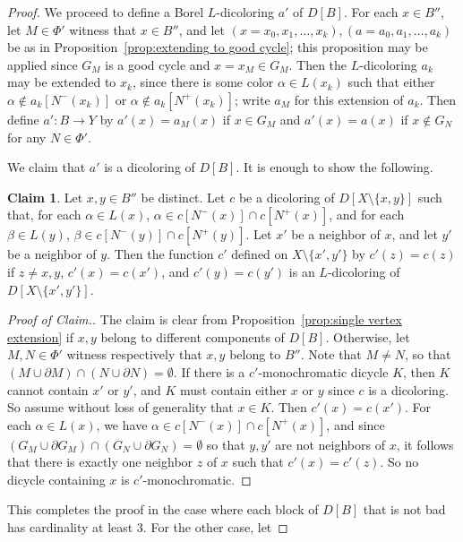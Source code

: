 \documentclass[psamsfonts]{amsart}
\theoremstyle{definition}
\newtheorem{claim}[thm]{Claim}
\theoremstyle{remark}
\numberwithin{equation}{section}
\begin{document}
\begin{proof}
    We proceed to define a Borel $L$-dicoloring $a'$ of $D[B]$. For each $x \in B''$, let $M \in \Phi'$ witness that $x \in B''$, and let $(x = x_0, x_1, \dots, x_k), (a = a_0, a_1, \dots, a_k)$ be as in Proposition~\ref{prop:extending to good cycle}; this proposition may be applied since $G_M$ is a good cycle and $x = x_M \in G_M$. Then the $L$-dicoloring $a_k$ may be extended to $x_k$, since there is some color $\alpha \in L(x_k)$ such that either $\alpha \notin a_k[N^-(x_k)]$ or $\alpha \notin a_k[N^+(x_k)]$; write $a_M$ for this extension of $a_k$. Then define $a' : B \rightarrow Y$ by $a'(x) = a_M(x)$ if $x \in G_M$ and $a'(x) = a(x)$ if $x \notin G_N$ for any $N \in \Phi'$. 
    
    We claim that $a'$ is a dicoloring of $D[B]$. It is enough to show the following.

    \begin{claim}
        Let $x, y \in B''$ be distinct. Let $c$ be a dicoloring of $D[X \setminus \{x, y \}]$ such that, for each $\alpha \in L(x)$, $\alpha \in c[N^-(x)] \cap c[N^+(x)]$, and for each $\beta \in L(y)$, $\beta \in c[N^-(y)] \cap c[N^+(y)]$. Let $x'$ be a neighbor of $x$, and let $y'$ be a neighbor of $y$. Then the function $c'$ defined on $X \setminus \{x', y'\}$ by $c'(z) = c(z)$ if $z \neq x, y$, $c'(x) = c(x')$, and $c'(y) = c(y')$ is an $L$-dicoloring of $D[X \setminus \{x', y'\}]$.
    \end{claim}

    \begin{proof}[Proof of Claim.]
        The claim is clear from Proposition~\ref{prop:single vertex extension} if $x, y$ belong to different components of $D[B]$. Otherwise, let $M, N \in \Phi'$ witness respectively that $x, y$ belong to $B''$. Note that $M \neq N$, so that $(M \cup \partial M) \cap (N \cup \partial N) = \emptyset$. If there is a $c'$-monochromatic dicycle $K$, then $K$ cannot contain $x'$ or $y'$, and $K$ must contain either $x$ or $y$ since $c$ is a dicoloring. So assume without loss of generality that $x \in K$. Then $c'(x) = c(x')$. For each $\alpha \in L(x)$, we have $\alpha \in c[N^-(x)] \cap c[N^+(x)]$, and since $(G_M \cup \partial G_M) \cap (G_N \cup \partial G_N) = \emptyset$ so that $y, y'$ are not neighbors of $x$, it follows that there is exactly one neighbor $z$ of $x$ such that $c'(x) = c'(z)$. So no dicycle containing $x$ is $c'$-monochromatic.
    \end{proof}
    
    This completes the proof in the case where each block of $D[B]$ that is not bad has cardinality at least $3$. For the other case, let 
    

\end{proof}
\end{document}
